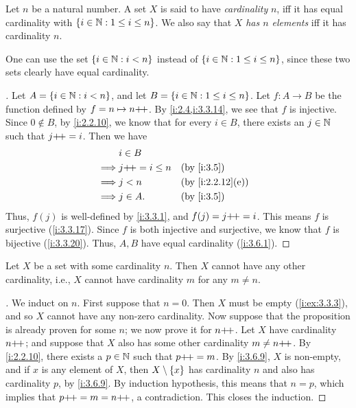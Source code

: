 \begin{defn}\label{i:3.6.5}
  Let \(n\) be a natural number.
  A set \(X\) is said to have \emph{cardinality} \(n\), iff it has equal cardinality with \(\left\lbrace i \in \mathbb{N} : 1 \leq i \leq n\right\rbrace\).
  We also say that \(X\) \emph{has \(n\) elements} iff it has cardinality \(n\).
\end{defn}

\begin{rmk}\label{i:3.6.6}
  One can use the set \(\left\lbrace i \in \mathbb{N} : i < n\right\rbrace\) instead of \(\left\lbrace i \in \mathbb{N} : 1 \leq i \leq n\right\rbrace\), since these two sets clearly have equal cardinality.
\end{rmk}

\begin{proof}[]
  Let \(A = \left\lbrace i \in \mathbb{N} : i < n\right\rbrace\), and let \(B = \left\lbrace i \in \mathbb{N} : 1 \leq i \leq n\right\rbrace\).
  Let \(f : A \to B\) be the function defined by \(f = n \mapsto n{+}\!{+}\).
  By \cref{i:2.4,i:3.3.14}, we see that \(f\) is injective.
  Since \(0 \notin B\), by \cref{i:2.2.10}, we know that for every \(i \in B\), there exists an \(j \in \mathbb{N}\) such that \(j{+}\!{+} = i\).
  Then we have
  \begin{align*}
             & i \in B                               \\
    \implies & j\pp = i \leq n &  & \by{i:3.5}       \\
    \implies & j < n           &  & \by{i:2.2.12}[e] \\
    \implies & j \in A.        &  & \by{i:3.5}
  \end{align*}
  Thus, \(f(j)\) is well-defined by \cref{i:3.3.1}, and \(f(j) = j{+}\!{+} = i\).
  This means \(f\) is surjective (\cref{i:3.3.17}).
  Since \(f\) is both injective and surjective, we know that \(f\) is bijective (\cref{i:3.3.20}).
  Thus, \(A, B\) have equal cardinality (\cref{i:3.6.1}).
\end{proof}

\setcounter{thm}{7}
\begin{prop}\label{i:3.6.8}
  Let \(X\) be a set with some cardinality \(n\).
  Then \(X\) cannot have any other cardinality, i.e., \(X\) cannot have cardinality \(m\) for any \(m \neq n\).
\end{prop}

\begin{proof}[]
  We induct on \(n\).
  First suppose that \(n = 0\).
  Then \(X\) must be empty (\cref{i:ex:3.3.3}), and so \(X\) cannot have any non-zero cardinality.
  Now suppose that the proposition is already proven for some \(n\);
  we now prove it for \(n{+}\!{+}\).
  Let \(X\) have cardinality \(n{+}\!{+}\);
  and suppose that \(X\) also has some other cardinality \(m \neq n{+}\!{+}\).
  By \cref{i:2.2.10}, there exists a \(p \in \mathbb{N}\) such that \(p{+}\!{+} = m\).
  By \cref{i:3.6.9}, \(X\) is non-empty, and if \(x\) is any element of \(X\), then \(X \setminus \left\lbrace x\right\rbrace\) has cardinality \(n\) and also has cardinality \(p\), by \cref{i:3.6.9}.
  By induction hypothesis, this means that \(n = p\), which implies that \(p{+}\!{+} = m = n{+}\!{+}\), a contradiction.
  This closes the induction.
\end{proof}

